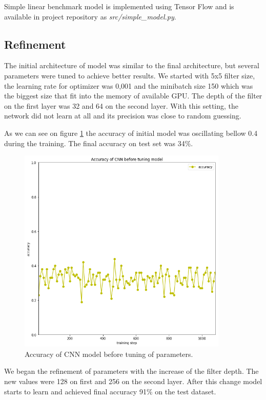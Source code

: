 \documentclass{article}
\begin{document}
Simple linear benchmark model is implemented using Tensor Flow and is
available in project repository as \textit{src/simple\_model.py}.

\subsection{Refinement}\label{refinement}

The initial architecture of model was similar to the final architecture,
but several parameters were tuned to achieve better results. We started
with 5x5 filter size, the learning rate for optimizer was 0,001 and the
minibatch size 150 which was the biggest size that fit into the memory
of available GPU. The depth of the filter on the first layer was 32 and
64 on the second layer. With this setting, the network did not learn at
all and its precision was close to random guessing.

As we can see on figure \ref{fig:InitialModelAccuracy} the accuracy of initial
model was oscillating bellow 0.4 during the training.  The final accuracy on
test set was 34\%.

\begin{figure}[!htp]
\centerline{\includegraphics[width=10cm]{img/initial_model_accuracy.png}}
\renewcommand{\figurename}{Figure}
\caption[Accuracy of CNN model before tuning of parameters.]{Accuracy of CNN model before tuning of parameters.}
\label{fig:InitialModelAccuracy}
\end{figure}

We began the refinement of parameters with the increase of the filter depth. The
new values were 128 on first and 256 on the second layer.  After this change
model starts to learn and achieved final accuracy 91\% on the test dataset.
\end{document}
